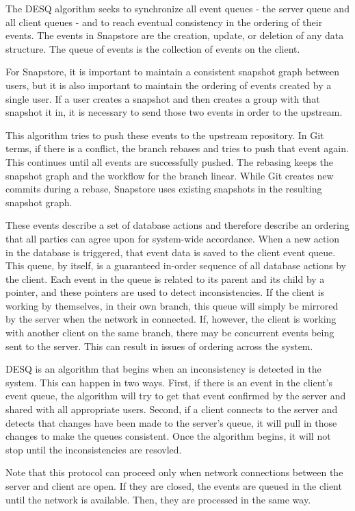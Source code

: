 The DESQ algorithm seeks to synchronize all event queues - the server queue and all client queues - and to reach eventual consistency in the ordering of their events. The events in Snapstore are the creation, update, or deletion of any data structure. The queue of events is the collection of events on the client.

For Snapstore, it is important to maintain a consistent snapshot graph between users, but it is also important to maintain the ordering of events created by a single user. If a user creates a snapshot and then creates a group with that snapshot it in, it is necessary to send those two events in order to the upstream. 

This algorithm tries to push these events to the upstream repository. In Git terms, if there is a conflict, the branch rebases and tries to push that event again. This continues until all events are successfully pushed. The rebasing keeps the snapshot graph and the workflow for the branch linear. While Git creates new commits during a rebase, Snapstore uses existing snapshots in the resulting snapshot graph.

These events describe a set of database actions and therefore describe an ordering that all parties can agree upon for system-wide accordance. When a new action in the database is triggered, that event data is saved to the client event queue. This queue, by itself, is a guaranteed in-order sequence of all database actions by the client. Each event in the queue is related to its parent and its child by a pointer, and these pointers are used to detect inconsistencies. If the client is working by themselves, in their own branch, this queue will simply be mirrored by the server when the network in connected. If, however, the client is working with another client on the same branch, there may be concurrent events being sent to the server. This can result in issues of ordering across the system.

DESQ is an algorithm that begins when an inconsistency is detected in the system. This can happen in two ways. First, if there is an event in the client's event queue, the algorithm will try to get that event confirmed by the server and shared with all appropriate users. Second, if a client connects to the server and detects that changes have been made to the server's queue, it will pull in those changes to make the queues consistent. Once the algorithm begins, it will not stop until the inconsistencies are resovled. 

Note that this protocol can proceed only when network connections between the server and client are open. If they are closed, the events are queued in the client until the network is available. Then, they are processed in the same way.

